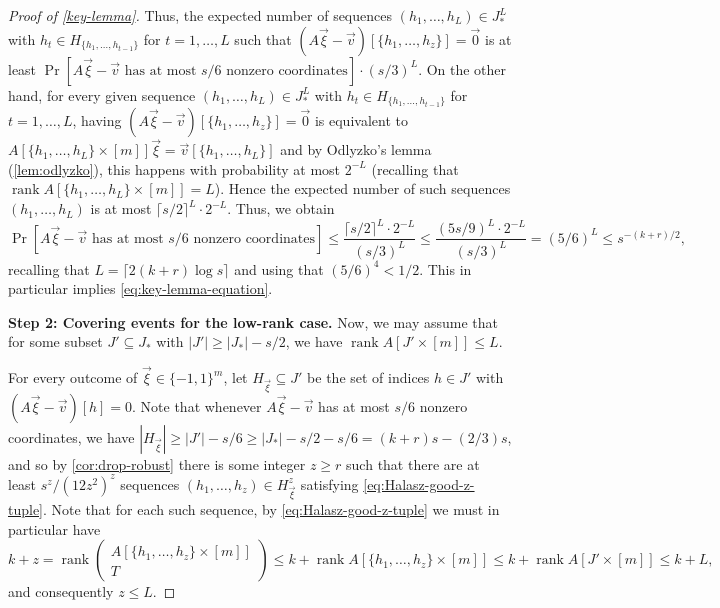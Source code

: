 \documentclass[english]{article}
\theoremstyle{remark}
\numberwithin{equation}{section}
\numberwithin{figure}{section}
\newcommand{\su}{\subseteq}
\newcommand{\rank}{\operatorname{rank}}
\newcommand{\on}{\operatorname}
\begin{document}
\begin{proof}[Proof of \cref{key-lemma}]
Thus, the expected number of sequences $(h_{1},\dots,h_{L})\in J_*^L$ with $h_{t}\in H_{\{h_1,\dots,h_{t-1}\}}$ for $t=1,\dots,L$ such that $(A\vec{\xi}-\vec{v})[\{h_1,\dots,h_z\}]=\vec 0$ is at least $\Pr[A\vec{\xi}-\vec{v}\text{ has at most }s/6\text{ nonzero coordinates}]\cdot (s/3)^L$. On the other hand, for every given sequence $(h_{1},\dots,h_{L})\in J_*^L$ with $h_{t}\in H_{\{h_1,\dots,h_{t-1}\}}$ for $t=1,\dots,L$, having $(A\vec{\xi}-\vec{v})[\{h_1,\dots,h_z\}]=\vec 0$ is equivalent to $A[\{h_{1},\dots,h_{L}\}\times [m]]\vec{\xi}=\vec{v}[\{h_{1},\dots,h_{L}\}]$ and by Odlyzko's lemma (\cref{lem:odlyzko}), this happens with probability at most $2^{-L}$ (recalling that $\on{rank} A[\{h_{1},\dots,h_{L}\}\times [m]]=L$). Hence the expected number of such sequences $(h_{1},\dots,h_{L})$ is at most $\lceil s/2\rceil^L\cdot 2^{-L}$. Thus, we obtain
\[\Pr[A\vec{\xi}-\vec{v}\text{ has at most }s/6\text{ nonzero coordinates}]\le \frac{\lceil s/2\rceil^L\cdot 2^{-L}}{(s/3)^L}\le \frac{(5s/9)^L\cdot 2^{-L}}{(s/3)^L}=(5/6)^L\le s^{-(k+r)/2},\]
recalling that $L=\lceil 2(k+r)\log s\rceil$ and using that $(5/6)^4<1/2$. This in particular implies \cref{eq:key-lemma-equation}.


\textbf{Step 2: Covering events for the low-rank case.} Now, we may assume that for some subset $J'\subseteq J_*$ with $|J'|\ge |J_*|-s/2$, we have $\rank A[J'\times [m]]\le L$.

For every outcome of $\vec{\xi}\in \{-1,1\}^m$, let $H_{\vec{\xi}}\su J'$ be the set of indices $h\in J'$ with $(A\vec{\xi}-\vec{v})[h]=0$. Note that whenever $A\vec{\xi}-\vec{v}$ has at most $s/6$ nonzero coordinates, we have $|H_{\vec{\xi}}|\ge |J'|-s/6\ge |J_*|-s/2-s/6=(k+r)s-(2/3)s$, and so by \cref{cor:drop-robust} there is some integer $z\ge r$ such that there are at least $s^z/(12z^2)^z$ sequences $(h_1,\dots,h_z)\in H_{\vec{\xi}}^z$ satisfying \cref{eq:Halasz-good-z-tuple}. Note that for each such sequence, by \cref{eq:Halasz-good-z-tuple} we must in particular have
\[k+z=\on{rank} \begin{pmatrix}A[\{h_{1},\dots,h_{z}\}\times[m]]\\
T
\end{pmatrix}\le k+\on{rank} A[\{h_{1},\dots,h_{z}\}\times[m]]\le k+\on{rank} A[J'\times[m]]\le k+L,\]
and consequently $z\le L$.


\end{proof}
\end{document}
